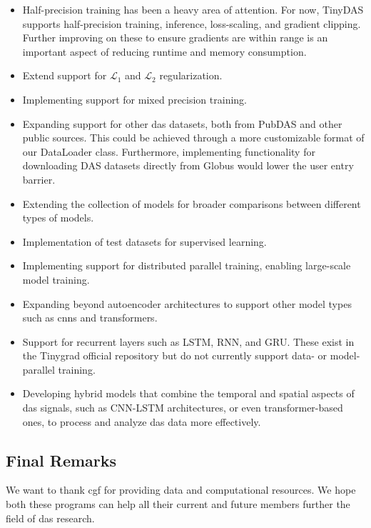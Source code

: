 \begin{itemize}
    \item  Half-precision training has been a heavy area of attention. For now, TinyDAS supports half-precision training, inference, loss-scaling, and gradient clipping. Further improving on these to ensure gradients are within range is an important aspect of reducing runtime and memory consumption. 
    \item Extend support for $\mathcal{L}_1$ and $\mathcal{L}_2$ regularization.
    \item Implementing support for mixed precision training.
    \item Expanding support for other \acrshort{das} datasets, both from PubDAS and other public sources. This could be achieved through a more customizable format of our DataLoader class. Furthermore, implementing functionality for downloading DAS datasets directly from Globus would lower the user entry barrier.
    \item Extending the collection of models for broader comparisons between different types of models.
    \item Implementation of test datasets for supervised learning.
    \item Implementing support for distributed parallel training, enabling large-scale model training. 
    \item Expanding beyond autoencoder architectures to support other model types such as \acrshort{cnn}s and transformers.
    \item Support for recurrent layers such as LSTM, RNN, and GRU. These exist in the Tinygrad official repository but do not currently support data- or model-parallel training.
    \item Developing hybrid models that combine the temporal and spatial aspects of \acrshort{das} signals, such as CNN-LSTM architectures, or even transformer-based ones, to process and analyze \acrshort{das} data more effectively.
\end{itemize}

\subsection{Final Remarks}

We want to thank \acrfull{cgf} for providing data and computational resources. We hope both these programs can help all their current and future members further the field of \acrshort{das} research.